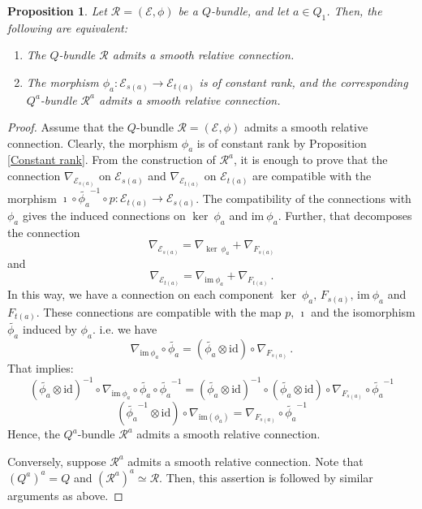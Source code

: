 \documentclass[12pt, reqno]{amsart}
\theoremstyle{plain}
\newtheorem{proposition}[theorem]{Proposition}
\numberwithin{equation}{section}
\newcommand{\im}{\mathrm{im}}
\begin{document}
\begin{proposition}\label{P:Conn-Q^a}
    Let $\mathcal{R}=(\mathcal{E},\phi)$ be a $Q$-bundle, and let $a\in Q_1$. Then, the following are equivalent:
    \begin{enumerate}
        \item The $Q$-bundle $\mathcal{R}$ admits a smooth relative connection.
        \item The morphism $\phi_a : \mathcal{E}_{s(a)}\rightarrow \mathcal{E}_{t(a)}$ is of constant rank, and the corresponding $Q^a$-bundle $\mathcal{R}^a$ admits a smooth relative connection.
    \end{enumerate}
\end{proposition}
\begin{proof}
Assume that the $Q$-bundle $\mathcal{R}=(\mathcal{E},\phi)$ admits a smooth relative connection. Clearly, the morphism $\phi_a$ is of constant rank by Proposition \ref{Constant rank}. From the construction of $\mathcal{R}^a$, it is enough to prove that the connection $\nabla_{\mathcal{E}_{s(a)}}$ on $\mathcal{E}_{s(a)}$ and $\nabla_{\mathcal{E}_{t(a)}}$ on $\mathcal{E}_{t(a)}$ are compatible with the morphism $\imath \circ \tilde{\phi_a}^{-1} \circ p : \mathcal{E}_{t(a)} \rightarrow \mathcal{E}_{s(a)}$. The compatibility of the connections with $\phi_a$ gives the induced connections on $\ker~\phi_a$ and $\im~\phi_a$. Further, that decomposes the connection
    $$\nabla_{\mathcal{E}_{s(a)}}=\nabla_{\ker~\phi_a}+\nabla_{F_{s(a)}}$$
    and 
    $$\nabla_{\mathcal{E}_{t(a)}}=\nabla_{\im~\phi_a}+\nabla_{F_{t(a)}}\,.$$
In this way, we have a connection on each component $\ker~\phi_a,\, F_{s(a)},\, \im~\phi_a$ and $F_{t(a)}$. These connections are compatible with the map $p,\, \imath$ and the isomorphism $\tilde{\phi_a}$ induced by $\phi_a$. i.e. we have
$$\nabla_{\im~\phi_a} \circ \tilde{\phi_a}= (\tilde{\phi_a}\otimes \mathrm{id})\circ \nabla_{F_{s(a)}}\,.$$
That implies: 
$$(\tilde{\phi_a}\otimes \mathrm{id})^{-1} \circ \nabla_{\im~\phi_a} \circ \tilde{\phi_a} \circ \tilde{\phi_a}^{-1}= (\tilde{\phi_a}\otimes \mathrm{id})^{-1} \circ (\tilde{\phi_a}\otimes \mathrm{id})\circ \nabla_{F_{s(a)}} \circ \tilde{\phi_a}^{-1}$$
$$(\tilde{\phi_a}^{-1} \otimes \mathrm{id}) \circ \nabla_{\im(\phi_a)}= \nabla_{F_{s(a)}} \circ \tilde{\phi_a}^{-1}$$
Hence, the $Q^a$-bundle $\mathcal{R}^a$ admits a smooth relative connection.

Conversely,  suppose $\mathcal{R}^a$ admits a smooth relative connection. Note that $(Q^a)^a=Q$ and $(\mathcal{R}^a)^a\simeq \mathcal{R}$. Then, this assertion is followed by similar arguments as above. 
\end{proof}
\end{document}
